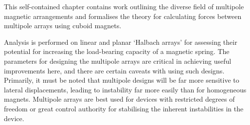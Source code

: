 \documentclass[11pt,a4paper]{memoir}
\begin{document}
This self-contained chapter contains work outlining the diverse field of multipole magnetic arrangements and formalises the theory for calculating forces between multipole arrays using cuboid magnets.

Analysis is performed on linear and planar `Halbach arrays' for assessing their potential for increasing the load-bearing capacity of a magnetic spring.
The parameters for designing the multipole arrays are critical in achieving useful improvements here, and there are certain caveats with using such designs.
Primarily, it must be noted that multipole designs will be far more sensitive to lateral displacements, leading to instability far more easily than for homogeneous magnets.
Multipole arrays are best used for devices with restricted degrees of freedom or great control authority for stabilising the inherent instabilities in the device.
\end{document}
